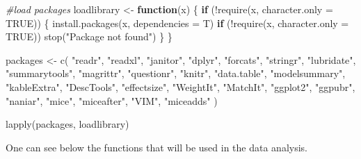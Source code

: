 \documentclass[
]{article}
\newenvironment{Shaded}{\begin{snugshade}}{\end{snugshade}}
\newcommand{\AttributeTok}[1]{\textcolor[rgb]{0.77,0.63,0.00}{#1}}
\newcommand{\CommentTok}[1]{\textcolor[rgb]{0.56,0.35,0.01}{\textit{#1}}}
\newcommand{\ConstantTok}[1]{\textcolor[rgb]{0.00,0.00,0.00}{#1}}
\newcommand{\ControlFlowTok}[1]{\textcolor[rgb]{0.13,0.29,0.53}{\textbf{#1}}}
\newcommand{\FunctionTok}[1]{\textcolor[rgb]{0.00,0.00,0.00}{#1}}
\newcommand{\NormalTok}[1]{#1}
\newcommand{\OtherTok}[1]{\textcolor[rgb]{0.56,0.35,0.01}{#1}}
\newcommand{\SpecialCharTok}[1]{\textcolor[rgb]{0.00,0.00,0.00}{#1}}
\newcommand{\StringTok}[1]{\textcolor[rgb]{0.31,0.60,0.02}{#1}}
\begin{document}
\begin{Shaded}
\begin{Highlighting}[]
\CommentTok{\#load packages}
\NormalTok{loadlibrary }\OtherTok{\textless{}{-}} \ControlFlowTok{function}\NormalTok{(x) \{}
  \ControlFlowTok{if}\NormalTok{ (}\SpecialCharTok{!}\FunctionTok{require}\NormalTok{(x, }\AttributeTok{character.only =} \ConstantTok{TRUE}\NormalTok{)) \{}
    \FunctionTok{install.packages}\NormalTok{(x, }\AttributeTok{dependencies =}\NormalTok{ T)}
    \ControlFlowTok{if}\NormalTok{ (}\SpecialCharTok{!}\FunctionTok{require}\NormalTok{(x, }\AttributeTok{character.only =} \ConstantTok{TRUE}\NormalTok{))}
      \FunctionTok{stop}\NormalTok{(}\StringTok{"Package not found"}\NormalTok{)}
\NormalTok{  \}}
\NormalTok{\}}

\NormalTok{packages }\OtherTok{\textless{}{-}}
  \FunctionTok{c}\NormalTok{(}
    \StringTok{"readr"}\NormalTok{,}
    \StringTok{"readxl"}\NormalTok{,}
    \StringTok{"janitor"}\NormalTok{,}
    \StringTok{"dplyr"}\NormalTok{,}
    \StringTok{"forcats"}\NormalTok{,}
    \StringTok{"stringr"}\NormalTok{,}
    \StringTok{"lubridate"}\NormalTok{,}
    \StringTok{"summarytools"}\NormalTok{,}
    \StringTok{"magrittr"}\NormalTok{,}
    \StringTok{"questionr"}\NormalTok{, }
    \StringTok{"knitr"}\NormalTok{,}
    \StringTok{"data.table"}\NormalTok{,}
    \StringTok{"modelsummary"}\NormalTok{, }
    \StringTok{"kableExtra"}\NormalTok{, }
    \StringTok{"DescTools"}\NormalTok{,  }
    \StringTok{"effectsize"}\NormalTok{,}
    \StringTok{"WeightIt"}\NormalTok{,}
    \StringTok{"MatchIt"}\NormalTok{,}
    \StringTok{"ggplot2"}\NormalTok{,}
    \StringTok{"ggpubr"}\NormalTok{, }
    \StringTok{"naniar"}\NormalTok{,}
    \StringTok{"mice"}\NormalTok{,}
    \StringTok{"miceafter"}\NormalTok{, }
    \StringTok{"VIM"}\NormalTok{,}
    \StringTok{"miceadds"}
\NormalTok{  )}

\FunctionTok{lapply}\NormalTok{(packages, loadlibrary)}
\end{Highlighting}
\end{Shaded}

One can see below the functions that will be used in the data analysis.
\end{document}
